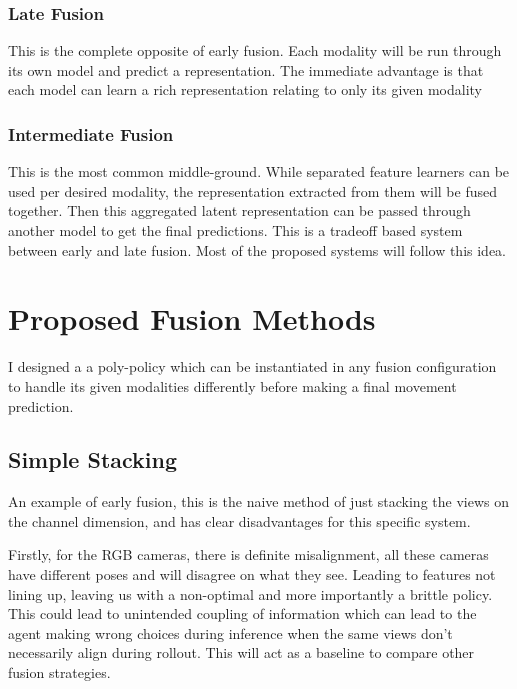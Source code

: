 \subsubsection{Late Fusion}
This is the complete opposite of early fusion. Each modality will be run through its own model and predict a representation. The immediate advantage is that each model can learn a rich representation relating to only its given modality


\subsubsection{Intermediate Fusion}
This is the most common middle-ground. While separated feature learners can be used per desired modality, the representation extracted from them will be fused together. Then this aggregated latent representation can be passed through another model to get the final predictions. This is a tradeoff based system between early and late fusion. Most of the proposed systems will follow this idea.


\section{Proposed Fusion Methods}
I designed a a poly-policy which can be instantiated in any fusion configuration to handle its given modalities differently before making a final movement prediction. 

\subsection{Simple Stacking}
An example of early fusion, this is the naive method of just stacking the views on the channel dimension, and has clear disadvantages for this specific system.

Firstly, for the RGB cameras, there is definite misalignment, all these cameras have different poses and will disagree on what they see. Leading to features not lining up, leaving us with a non-optimal and more importantly a brittle policy. This could lead to unintended coupling of information which can lead to the agent making wrong choices during inference when the same views don't necessarily align during rollout. This will act as a baseline to compare other fusion strategies.

